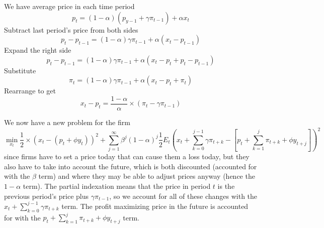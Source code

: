 \documentclass[11pt]{amsart}
\begin{document}
We have average price in each time period
\[
p_t = (1-\alpha) (p_{y-1} + \gamma \pi_{t-1}) + \alpha x_t
\]
Subtract last period's price from both sides
\[
p_t - p_{t-1} = (1-\alpha) \gamma \pi_{t-1} + \alpha (x_t - p_{t-1})
\]
Expand the right side
\[
p_t - p_{t-1} = (1-\alpha) \gamma \pi_{t-1} + \alpha (x_t  - p_t + p_t - p_{t-1})
\]
Substitute
\[
\pi_t = (1-\alpha) \gamma \pi_{t-1} + \alpha (x_t  - p_t + \pi_t)
\]
Rearrange to get
\[
x_t - p_t = \frac{1-\alpha}{\alpha} \times (\pi_t - \gamma \pi_{t-1})
\]

We now have a new problem for the firm
\[
\min_{x_t} \frac{1}{2} \times (x_t - (p_t + \phi y_t))^2 + \sum_{j=1}^{\infty} \beta^j (1-\alpha)^j  \frac{1}{2} E_t \left( x_t + \sum_{k=0}^{j-1} \gamma \pi_{t+k} - \left[ p_t + \sum_{k=1}^j \pi_{t+k} + \phi y_{t+j} \right] \right)^2
\]
since firms have to set a price today that can cause them a loss today, but they also have to take into account the future, which is both discounted (accounted for with the $\beta$ term) and where they may be able to adjust prices anyway (hence the $1-\alpha$ term).
The partial indexation means that the price in period $t$ is the previous period's price plus $\gamma \pi_{t-1}$, so we account for all of these changes with the $x_t + \sum_{k=0}^{j-1} \gamma \pi_{t+k}$ term.
The profit maximizing price in the future is accounted for with the $p_t + \sum_{k=1}^j \pi_{t+k} + \phi y_{t+j}$ term.
\end{document}
